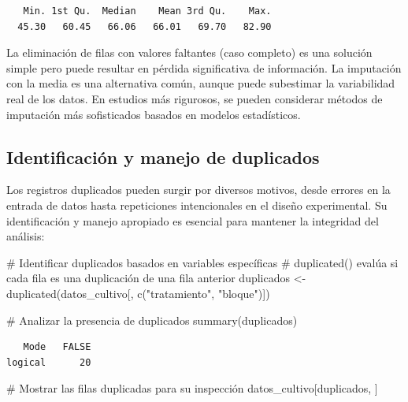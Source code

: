 \documentclass[
  spanish,
  a4paper,
  DIV=11,
  numbers=noendperiod,
  onepage,
  openany]{scrreprt}
\newenvironment{Shaded}{\begin{snugshade}}{\end{snugshade}}
\newcommand{\CommentTok}[1]{\textcolor[rgb]{0.37,0.37,0.37}{#1}}
\newcommand{\FunctionTok}[1]{\textcolor[rgb]{0.28,0.35,0.67}{#1}}
\newcommand{\NormalTok}[1]{\textcolor[rgb]{0.00,0.23,0.31}{#1}}
\newcommand{\OtherTok}[1]{\textcolor[rgb]{0.00,0.23,0.31}{#1}}
\newcommand{\StringTok}[1]{\textcolor[rgb]{0.13,0.47,0.30}{#1}}
\begin{document}
\begin{verbatim}
   Min. 1st Qu.  Median    Mean 3rd Qu.    Max. 
  45.30   60.45   66.06   66.01   69.70   82.90 
\end{verbatim}

La eliminación de filas con valores faltantes (caso completo) es una
solución simple pero puede resultar en pérdida significativa de
información. La imputación con la media es una alternativa común, aunque
puede subestimar la variabilidad real de los datos. En estudios más
rigurosos, se pueden considerar métodos de imputación más sofisticados
basados en modelos estadísticos.

\subsection{Identificación y manejo de
duplicados}\label{identificaciuxf3n-y-manejo-de-duplicados}

Los registros duplicados pueden surgir por diversos motivos, desde
errores en la entrada de datos hasta repeticiones intencionales en el
diseño experimental. Su identificación y manejo apropiado es esencial
para mantener la integridad del análisis:

\begin{Shaded}
\begin{Highlighting}[]
\CommentTok{\# Identificar duplicados basados en variables específicas}
\CommentTok{\# duplicated() evalúa si cada fila es una duplicación de una fila anterior}
\NormalTok{duplicados }\OtherTok{\textless{}{-}} \FunctionTok{duplicated}\NormalTok{(datos\_cultivo[, }\FunctionTok{c}\NormalTok{(}\StringTok{"tratamiento"}\NormalTok{, }\StringTok{"bloque"}\NormalTok{)])}

\CommentTok{\# Analizar la presencia de duplicados}
\FunctionTok{summary}\NormalTok{(duplicados)}
\end{Highlighting}
\end{Shaded}

\begin{verbatim}
   Mode   FALSE 
logical      20 
\end{verbatim}

\begin{Shaded}
\begin{Highlighting}[]
\CommentTok{\# Mostrar las filas duplicadas para su inspección}
\NormalTok{datos\_cultivo[duplicados, ]}
\end{Highlighting}
\end{Shaded}
\end{document}
